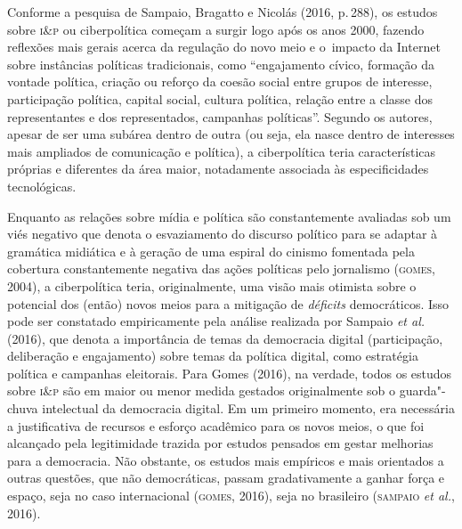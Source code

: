 Conforme a pesquisa de Sampaio, Bragatto e Nicolás (2016, p.\,288), os
estudos sobre \textsc{i\&p} ou ciberpolítica começam a surgir
logo após os anos 2000, fazendo reflexões mais gerais acerca da
regulação do novo meio e o~impacto da Internet sobre instâncias
políticas tradicionais, como ``engajamento cívico, formação da vontade
política, criação ou reforço da coesão social entre grupos de interesse,
participação política, capital social, cultura política, relação entre a
classe dos representantes e dos representados, campanhas políticas''.
Segundo os autores, apesar de ser uma subárea dentro de outra (ou seja,
ela nasce dentro de interesses mais ampliados de comunicação e
política), a ciberpolítica teria características próprias e diferentes
da área maior, notadamente associada às especificidades tecnológicas.

Enquanto as relações sobre mídia e política são constantemente avaliadas
sob um viés negativo que denota o esvaziamento do discurso político para
se adaptar à gramática midiática e à geração de uma espiral do cinismo
fomentada pela cobertura constantemente negativa das ações políticas
pelo jornalismo (\textsc{gomes}, 2004), a ciberpolítica teria, originalmente, uma
visão mais otimista sobre o potencial dos (então) novos meios para a
mitigação de \textit{déficits} democráticos. Isso pode ser constatado
empiricamente pela análise realizada por Sampaio \textit{et al.} (2016),
que denota a importância de temas da democracia digital (participação,
deliberação e engajamento) sobre temas da política digital, como
estratégia política e campanhas eleitorais. Para Gomes (2016), na
verdade, todos os estudos sobre \textsc{i\&p} são em maior ou
menor medida gestados originalmente sob o guarda"-chuva intelectual da
democracia digital. Em um primeiro momento, era necessária a
justificativa de recursos e esforço acadêmico para os novos meios, o que
foi alcançado pela legitimidade trazida por estudos pensados em gestar
melhorias para a democracia. Não obstante, os estudos mais empíricos e
mais orientados a outras questões, que não democráticas, passam
gradativamente a ganhar força e espaço, seja no caso internacional
(\textsc{gomes}, 2016), seja no brasileiro (\textsc{sampaio} \textit{et al.}, 2016).

